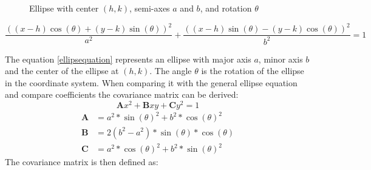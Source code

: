 \begin{figure}[h]
    \centering
    \caption{Ellipse with center $(h,k)$, semi-axes $a$ and $b$, and rotation $\theta$}
    \label{fig:sampleellipse}
\end{figure}

\begin{equation}
    \frac{((x-h)\cos(\theta) + (y-k)\sin(\theta))^2}{a^2} + \frac{((x-h)\sin(\theta) - (y-k)\cos(\theta))^2}{b^2} = 1
    \label{ellipsequation}
\end{equation}

The equation \ref{ellipsequation} represents an ellipse with major axis $a$, minor axis $b$ and the center of the ellipse at $(h,k)$. The angle $\theta$ is the rotation of the ellipse in the coordinate system. When comparing it with the general ellipse equation and compare coefficients the covariance matrix can be derived:
\begin{equation}
    \mathbf{A}x^2 + \mathbf{B}xy + \mathbf{C}y^2 = 1
    \label{ellipseco}
\end{equation} 
\begin{align}
    \mathbf{A}&=a^2 * \sin (\theta)^2 + b^2*\cos (\theta)^2 \\
    \mathbf{B}&= 2(b^2-a^2)*\sin (\theta)*\cos (\theta) \\
    \mathbf{C}&= a^2*\cos (\theta)^2 + b^2*\sin (\theta)^2
    \label{coefficients}
\end{align}
The covariance matrix is then defined as:

